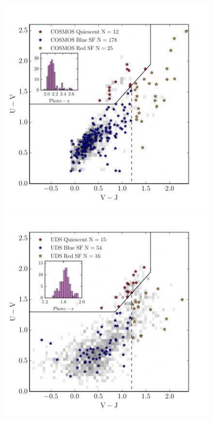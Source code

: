 \documentclass[iop]{emulateapj}
\begin{document}
\begin{figure}
\includegraphics[scale=0.60]{figures/Rest_frame_UVJ_pre_observed.pdf}
\includegraphics[scale=0.60]{figures/Rest_frame_UVJ_pre_observed_UDS.pdf}

\end{figure}
\end{document}
